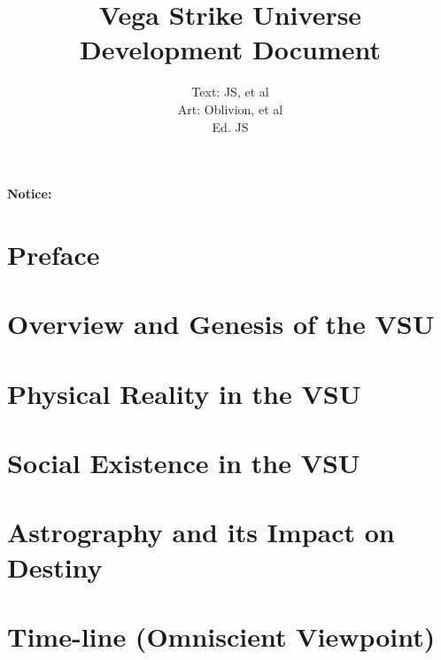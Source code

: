 

\title{Vega Strike Universe \\ 
Development Document}

\author{Text: JS, et al\\
Art: Oblivion, et al \\
Ed. JS}

\renewcommand{\thepage}{\roman{page}}
\maketitle
\renewcommand{\thepage}{\arabic{page}}
\thispagestyle{empty}
\centerline{\bf {\Huge Notice:}}
{\it

}

\setcounter{tocdepth}{2}
\clearpage
{}
\tableofcontents
\listoftables
{}
\listoffigures
{}

\chapter*{Preface}


\chapter{Overview and Genesis of the VSU}


\chapter{Physical Reality in the VSU}


\chapter{Social Existence in the VSU}


\chapter{Astrography and its Impact on Destiny}


\chapter{Time-line (Omniscient Viewpoint)}


